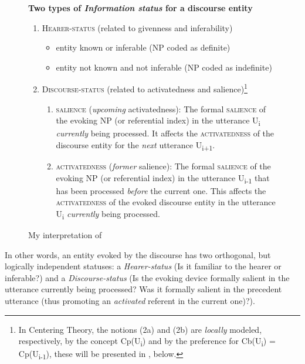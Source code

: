 \documentclass[output=paper
,modfonts
,nonflat]{langsci/langscibook}
\begin{document}
\begin{figure} 
	\centering 
	\caption{My interpretation of ~\citet{WalkerPrince1996}} 
	\label{fig:pico:1}
	\textbf{Two types of \textit{Information status} for a discourse entity}
	\begin{enumerate}
		\item \textsc{Hearer-status} (related to givenness and inferability)
		\begin{itemize}
			\item entity known or inferable (NP coded as definite)
			\item entity not known and not inferable (NP coded as indefinite)
		\end{itemize}
		\item \textsc{Discourse-status} (related to activatedness and salience)\footnote{In Centering Theory, the notions (2a) and (2b) are \textit{locally} modeled, respectively, by the concept Cp(U\textsubscript{i}) and by the preference for Cb(U\textsubscript{i}) = Cp(U\textsubscript{i-1}), these will be presented in , below.}
		\begin{enumerate}
			\item \textsc{salience} (\textit{upcoming} activatedness): The formal \textsc{salience} of the evoking NP (or referential index) in the utterance U\textsubscript{i} \textit{currently} being processed. It affects the \textsc{activatedness} of the discourse entity for the \textit{next} utterance U\textsubscript{i+1}.
			\item \textsc{activatedness} (\textit{former} salience): The formal \textsc{salience} of the evoking NP (or referential index) in the utterance U\textsubscript{i-1} that has been processed \textit{before} the current one. This affects the \textsc{activatedness} of the evoked discourse entity in the utterance U\textsubscript{i} \textit{currently} being processed.
		\end{enumerate}
	\end{enumerate}
\end{figure} 

In other words, an entity evoked by the discourse has two orthogonal, but logically independent statuses: a \textit{Hearer-status} (Is it familiar to the hearer or inferable?) and a \textit{Discourse-status} (Is the evoking device formally salient in the utterance currently being processed? Was it formally salient in the precedent utterance (thus promoting an \textit{activated} referent in the current one)?).
\end{document}

